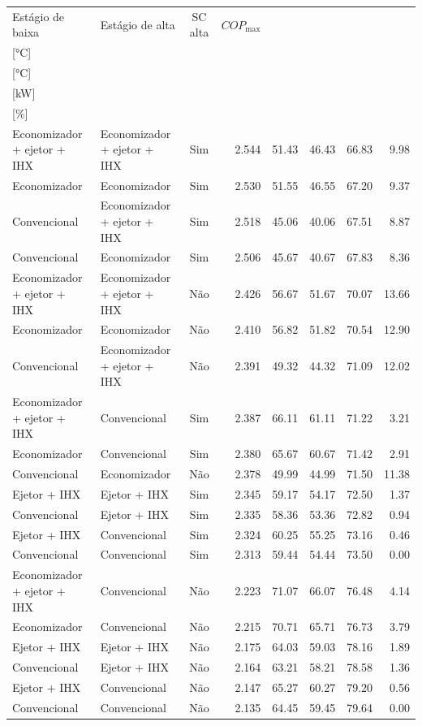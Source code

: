 {\small\setlength{\tabcolsep}{4pt}\renewcommand{\arraystretch}{1.12}
\begin{tabular}{llcrrrrr}
\toprule
Estágio de baixa & Estágio de alta & SC alta & $COP_{\max}$ & \shortstack{$T_{\mathrm{cond,l}}^*$\\{[°C]}} & \shortstack{$T_{\mathrm{evap,h}}^*$\\{[°C]}} & \shortstack{$\dot W_{\mathrm{liq}}$\\{[kW]}} & \shortstack{$\Delta COP_{\mathrm{opt}}$\\{[\%]}} \\
\midrule
Economizador + ejetor + IHX & Economizador + ejetor + IHX & Sim & 2.544 & 51.43 & 46.43 & 66.83 & 9.98 \\
Economizador & Economizador & Sim & 2.530 & 51.55 & 46.55 & 67.20 & 9.37 \\
Convencional & Economizador + ejetor + IHX & Sim & 2.518 & 45.06 & 40.06 & 67.51 & 8.87 \\
Convencional & Economizador & Sim & 2.506 & 45.67 & 40.67 & 67.83 & 8.36 \\
Economizador + ejetor + IHX & Economizador + ejetor + IHX & Não & 2.426 & 56.67 & 51.67 & 70.07 & 13.66 \\
Economizador & Economizador & Não & 2.410 & 56.82 & 51.82 & 70.54 & 12.90 \\
Convencional & Economizador + ejetor + IHX & Não & 2.391 & 49.32 & 44.32 & 71.09 & 12.02 \\
Economizador + ejetor + IHX & Convencional & Sim & 2.387 & 66.11 & 61.11 & 71.22 & 3.21 \\
Economizador & Convencional & Sim & 2.380 & 65.67 & 60.67 & 71.42 & 2.91 \\
Convencional & Economizador & Não & 2.378 & 49.99 & 44.99 & 71.50 & 11.38 \\
Ejetor + IHX & Ejetor + IHX & Sim & 2.345 & 59.17 & 54.17 & 72.50 & 1.37 \\
Convencional & Ejetor + IHX & Sim & 2.335 & 58.36 & 53.36 & 72.82 & 0.94 \\
Ejetor + IHX & Convencional & Sim & 2.324 & 60.25 & 55.25 & 73.16 & 0.46 \\
Convencional & Convencional & Sim & 2.313 & 59.44 & 54.44 & 73.50 & 0.00 \\
Economizador + ejetor + IHX & Convencional & Não & 2.223 & 71.07 & 66.07 & 76.48 & 4.14 \\
Economizador & Convencional & Não & 2.215 & 70.71 & 65.71 & 76.73 & 3.79 \\
Ejetor + IHX & Ejetor + IHX & Não & 2.175 & 64.03 & 59.03 & 78.16 & 1.89 \\
Convencional & Ejetor + IHX & Não & 2.164 & 63.21 & 58.21 & 78.58 & 1.36 \\
Ejetor + IHX & Convencional & Não & 2.147 & 65.27 & 60.27 & 79.20 & 0.56 \\
Convencional & Convencional & Não & 2.135 & 64.45 & 59.45 & 79.64 & 0.00 \\
\bottomrule
\end{tabular}
}
